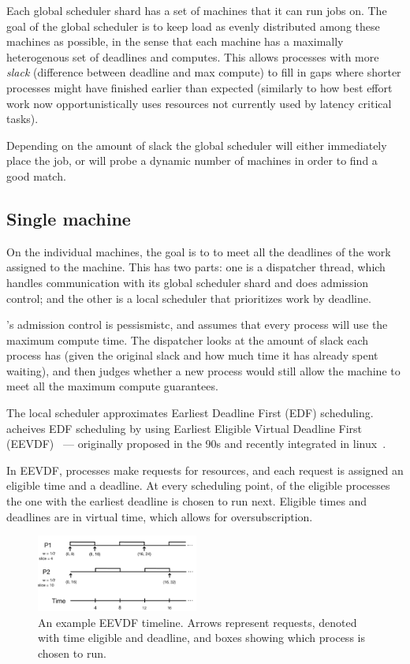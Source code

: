 Each global scheduler shard has a set of machines that it can run jobs on. The
goal of the global scheduler is to keep load as evenly distributed among these
machines as possible, in the sense that each machine has a maximally
heterogenous set of deadlines and computes. This allows processes with more
\textit{slack} (difference between deadline and max compute) to fill in gaps
where shorter processes might have finished earlier than expected (similarly to
how best effort work now opportunistically uses resources not currently used by
latency critical tasks).

Depending on the amount of slack the global scheduler will either immediately
place the job, or will probe a dynamic number of machines in order to find a
good match.


\subsection*{Single machine}

On the individual machines, the goal is to to meet all the deadlines of the work
assigned to the machine. This has two parts: one is a dispatcher thread, which
handles communication with its global scheduler shard and does admission
control; and the other is a local scheduler that prioritizes work by deadline.

\sysname{}'s admission control is pessismistc, and assumes that every process will use the
maximum compute time. The dispatcher looks at the amount of slack each process
has (given the original slack and how much time it has already spent waiting),
and then judges whether a new process would still allow the machine to meet all
the maximum compute guarantees.


The local scheduler approximates Earliest Deadline First (EDF) scheduling.
\sysname{} acheives EDF scheduling by using Earliest Eligible Virtual Deadline
First (EEVDF)~\cite{eevdf} --- originally proposed in the 90s and recently
integrated in linux~\cite{linuxeevdf}.

In EEVDF, processes make requests for resources, and each request is assigned an
eligible time and a deadline. At every scheduling point, of the eligible
processes the one with the earliest deadline is chosen to run next. Eligible
times and deadlines are in virtual time, which allows for oversubscription. 

\begin{figure}[t!]
    \centering
    \includegraphics[height=1in]{img/eevdf.png}
    \caption{An example EEVDF timeline. Arrows represent requests, denoted with
        time eligible and deadline, and boxes showing which process is chosen to
        run.}
    \label{fig:eevdf}
\end{figure}

